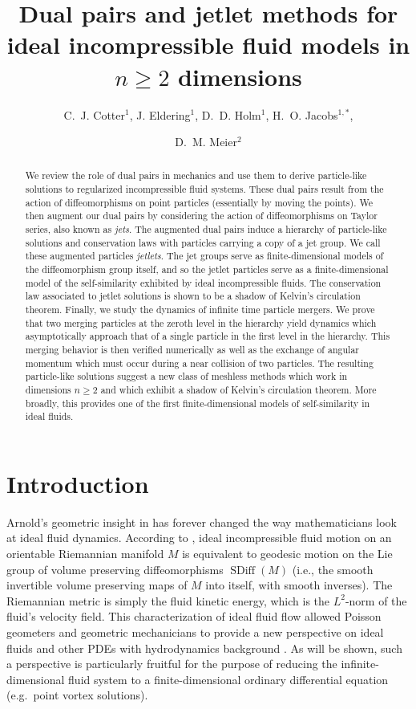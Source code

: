\documentclass[12pt]{amsart}
\title[Dual pairs and jetlet methods for ideal fluids]%
{Dual pairs and jetlet methods for ideal incompressible fluid models in $n \geq 2$ dimensions}
\author{C.~J. Cotter$^1$, J. Eldering$^1$, D.~D. Holm$^1$, H.~O. Jacobs$^{1,*}$,}
\author{D.~M. Meier$^2$}
\DeclareMathOperator{\SDiff}{SDiff}
\begin{document}
\begin{abstract}
  We review the role of dual pairs in mechanics and use them
  to derive particle-like solutions to regularized incompressible
  fluid systems.
  These dual pairs result from the action of diffeomorphisms on point
  particles (essentially by moving the points).
  We then augment our dual pairs by considering the action of diffeomorphisms
  on Taylor series, also known as \emph{jets}.
  The augmented dual pairs induce a hierarchy of particle-like solutions
  and conservation laws
  with particles carrying a copy of a jet group.
  We call these augmented particles \emph{jetlets}.
  The jet groups serve as finite-dimensional models of the diffeomorphism
  group itself, and so the jetlet particles serve as a finite-dimensional
  model of the self-similarity exhibited by ideal
  incompressible fluids.
  The conservation law associated to jetlet solutions is 
  shown to be a shadow of Kelvin's circulation theorem.
  Finally, we study the dynamics of infinite time particle mergers.
  We prove that two merging particles at the zeroth level in the hierarchy
  yield dynamics which asymptotically approach that of a single particle in the first level in the hierarchy.
  This merging behavior is then verified numerically
  as well as the exchange of angular momentum which must
  occur during a near collision of two particles.
  The resulting particle-like solutions suggest a new class
  of meshless methods which work in dimensions $n \geq 2$
  and which exhibit a shadow of Kelvin's circulation theorem.
  More broadly, this provides one of the first finite-dimensional models of
  self-similarity in ideal fluids.
\end{abstract}

\maketitle

\section{Introduction}
Arnold's geometric insight in \cite{Arnold1966}  has forever changed the way mathematicians look at ideal fluid dynamics.  According to \cite{Arnold1966}, ideal incompressible fluid motion on an
orientable Riemannian manifold $M$ is equivalent to geodesic motion on the Lie group of volume preserving diffeomorphisms $\SDiff(M)$ (i.e., the smooth invertible volume preserving maps of $M$ into itself, with smooth inverses).
The Riemannian metric is simply the fluid kinetic energy, which is the $L^2$-norm of the fluid's velocity field.
This characterization of ideal fluid flow allowed Poisson geometers and geometric mechanicians to provide a new perspective on ideal fluids and other PDEs with hydrodynamics background \cite{EbinMarsden1970,MarsdenWeinstein1983,Zeitlin1991,ArnoldKhesin1998,HolmMarsdenRatiu1998,FoiasHolmTiti2001}.
As will be shown, such a perspective is particularly fruitful for the purpose of reducing the infinite-dimensional fluid system
to a finite-dimensional ordinary differential equation (e.g.\ point vortex solutions).
\end{document}
